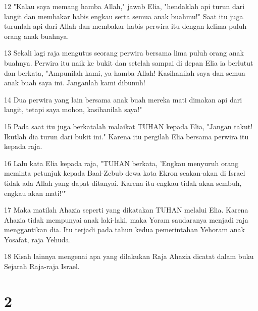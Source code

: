 \par 12 "Kalau saya memang hamba Allah," jawab Elia, "hendaklah api turun dari langit dan membakar habis engkau serta semua anak buahmu!" Saat itu juga turunlah api dari Allah dan membakar habis perwira itu dengan kelima puluh orang anak buahnya.
\par 13 Sekali lagi raja mengutus seorang perwira bersama lima puluh orang anak buahnya. Perwira itu naik ke bukit dan setelah sampai di depan Elia ia berlutut dan berkata, "Ampunilah kami, ya hamba Allah! Kasihanilah saya dan semua anak buah saya ini. Janganlah kami dibunuh!
\par 14 Dua perwira yang lain bersama anak buah mereka mati dimakan api dari langit, tetapi saya mohon, kasihanilah saya!"
\par 15 Pada saat itu juga berkatalah malaikat TUHAN kepada Elia, "Jangan takut! Ikutlah dia turun dari bukit ini." Karena itu pergilah Elia bersama perwira itu kepada raja.
\par 16 Lalu kata Elia kepada raja, "TUHAN berkata, 'Engkau menyuruh orang meminta petunjuk kepada Baal-Zebub dewa kota Ekron seakan-akan di Israel tidak ada Allah yang dapat ditanyai. Karena itu engkau tidak akan sembuh, engkau akan mati!'"
\par 17 Maka matilah Ahazia seperti yang dikatakan TUHAN melalui Elia. Karena Ahazia tidak mempunyai anak laki-laki, maka Yoram saudaranya menjadi raja menggantikan dia. Itu terjadi pada tahun kedua pemerintahan Yehoram anak Yosafat, raja Yehuda.
\par 18 Kisah lainnya mengenai apa yang dilakukan Raja Ahazia dicatat dalam buku Sejarah Raja-raja Israel.

\chapter{2}

